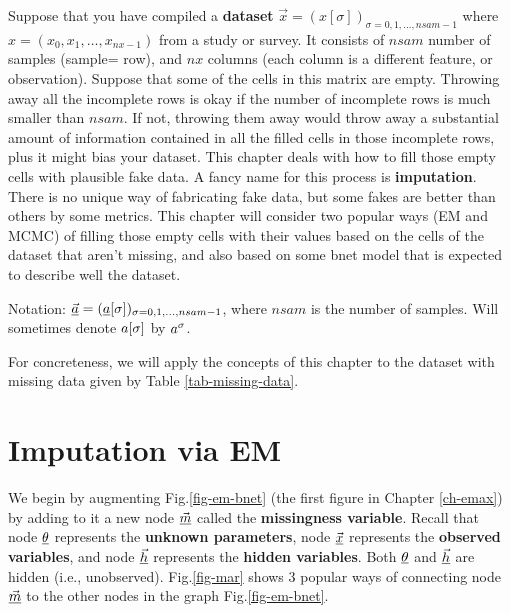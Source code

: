 Suppose that you
have compiled a {\bf dataset}
$\vec{x}=(x[\sigma])_{\sigma=0, 1, \ldots,
nsam-1}$
where $x=(x_0, x_1, \ldots,x_{ nx-1})$
from a study or survey.
It consists 
of $nsam$ number 
of samples (sample= row), 
and $nx$ columns (each column is a different 
feature, or observation).
Suppose that some of the
cells
in this matrix 
are empty.
Throwing
away all the incomplete
rows is okay 
if the 
number
of incomplete rows
is much smaller  than
$nsam$.
If not,
throwing 
them
away would
throw away
a substantial amount of
information 
contained in all the
filled cells
in those incomplete rows, 
plus it might
bias your dataset.
This chapter
deals with
how to fill
those empty cells 
with plausible
fake data.
A fancy name
for this process
is {\bf imputation}.
There is no unique
way of 
fabricating
fake data,
but
some fakes
are
better than others
by some metrics.
This chapter will
consider
two popular
ways (EM
and MCMC)
of 
filling those
empty 
cells
with
their
 values
based on the cells
of the dataset that
aren't missing,
and
also based
on some bnet
model
that is 
expected to describe well the
dataset.

Notation:
$\vec{\rva}=
(\rva[\sigma])_{\sigma=0, 1, \ldots,nsam-1}
$, where $nsam$
is the number of samples.
Will
sometimes
denote
$a[\sigma]$ by $a^\sigma$.


For concreteness,
we will
apply
the concepts
of this chapter
to
the dataset
with missing data
given by Table \ref{tab-missing-data}.


\section{Imputation via EM}

We begin by augmenting
Fig.\ref{fig-em-bnet} (the first figure
in Chapter \ref{ch-emax})
by adding to it a new node
$\vec{\rvm}$
called the
{\bf missingness variable}.
Recall
that node
$\ul{\theta}$
represents
the {\bf unknown parameters},
node $\vec{\rvx}$
represents the
{\bf observed variables},
and 
node $\vec{\rvh}$
represents the {\bf hidden
variables}.
Both $\ul{\theta}$
and $\vec{\rvh}$
are hidden (i.e., unobserved).
Fig.\ref{fig-mar}
shows
3
popular
ways of 
connecting node $\vec{\rvm}$
 to the
other nodes
in the graph Fig.\ref{fig-em-bnet}.



